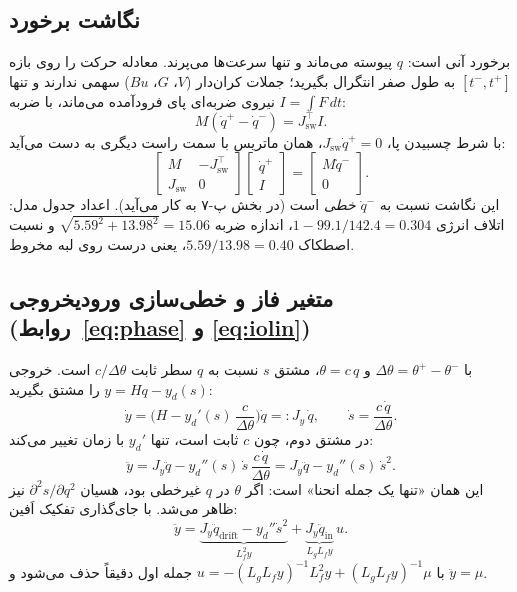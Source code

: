 \documentclass[10pt,twocolumn]{article}
\newcommand{\en}[1]{\lr{#1}}
\newcommand{\nd}{\lr{\textendash}}
\begin{document}
\subsection{نگاشت برخورد}
برخورد آنی است: $q$ پیوسته می‌ماند و تنها سرعت‌ها می‌پرند. معادله حرکت را روی بازه
$[t^-,t^+]$ به طول صفر انتگرال بگیرید؛ جملات کران‌دار ($V$، $G$، $Bu$) سهمی ندارند و تنها
نیروی ضربه‌ای پای فرودآمده می‌ماند، با ضربه $I=\int F\,dt$:
\begin{equation*}
    M(\dot q^{+}-\dot q^{-})=J_{\mathrm{sw}}^{\top}I .
\end{equation*}
با شرط چسبیدن پا، $J_{\mathrm{sw}}\dot q^{+}=0$، همان ماتریس \en{KKT} با سمت راست دیگری به دست
می‌آید:
\begin{equation*}
    \begin{bmatrix} M & -J_{\mathrm{sw}}^{\top} \\ J_{\mathrm{sw}} & 0 \end{bmatrix}
    \begin{bmatrix} \dot q^{+} \\ I \end{bmatrix}
    =\begin{bmatrix} M\dot q^{-} \\ 0 \end{bmatrix}.
\end{equation*}
این نگاشت نسبت به $\dot q^{-}$ \emph{خطی} است (در بخش پ-۷ به کار می‌آید). اعداد جدول مدل:
اتلاف انرژی $1-99.1/142.4=0.304$، اندازه ضربه $\sqrt{5.59^2+13.98^2}=15.06$ و نسبت اصطکاک
$5.59/13.98=0.40$، یعنی درست روی لبه مخروط.

\subsection{متغیر فاز و خطی‌سازی ورودی\nd{}خروجی (روابط~\eqref{eq:phase} و \eqref{eq:iolin})}
با $\Delta\theta=\theta^{+}-\theta^{-}$ و $\theta=c\,q$، مشتق $s$ نسبت به $q$ سطر ثابت
$c/\Delta\theta$ است. خروجی $y=Hq-y_d(s)$ را مشتق بگیرید:
\begin{equation*}
    \dot y=\Big(H-y_d'(s)\,\frac{c}{\Delta\theta}\Big)\dot q=:J_y\,\dot q,
    \qquad \dot s=\frac{c\,\dot q}{\Delta\theta}.
\end{equation*}
در مشتق دوم، چون $c$ ثابت است، تنها $y_d'$ با زمان تغییر می‌کند:
\begin{equation*}
    \ddot y=J_y\ddot q-y_d''(s)\,\dot s\,\frac{c\,\dot q}{\Delta\theta}
    =J_y\ddot q-y_d''(s)\,\dot s^{2}.
\end{equation*}
این همان «تنها یک جمله انحنا» است: اگر $\theta$ در $q$ غیرخطی بود، هسیان $\partial^2 s/\partial q^2$
نیز ظاهر می‌شد. با جای‌گذاری تفکیک اَفین:
\begin{equation*}
    \ddot y=\underbrace{J_y\ddot q_{\mathrm{drift}}-y_d''\dot s^{2}}_{L_f^2y}
    +\underbrace{J_y\ddot q_{\mathrm{in}}}_{L_gL_fy}\,u .
\end{equation*}
با $u=-(L_gL_fy)^{-1}L_f^2y+(L_gL_fy)^{-1}\mu$ جمله اول دقیقاً حذف می‌شود و $\ddot y=\mu$.
\end{document}
